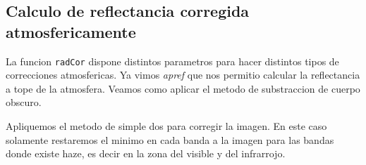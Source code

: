 \subsection{Calculo de reflectancia corregida atmosfericamente}

La funcion \texttt{radCor} dispone distintos parametros para hacer distintos
tipos de correcciones atmosfericas. Ya vimos \emph{apref} que nos permitio
calcular la reflectancia a tope de la atmosfera. Veamos como aplicar el metodo
de substraccion de cuerpo obscuro.

\begin{exa}
    Apliquemos el metodo de simple dos para corregir la imagen. En este caso
    solamente restaremos el minimo en cada banda a la imagen para las bandas
    donde existe haze, es decir en la zona del visible y del infrarrojo.


\end{exa}
